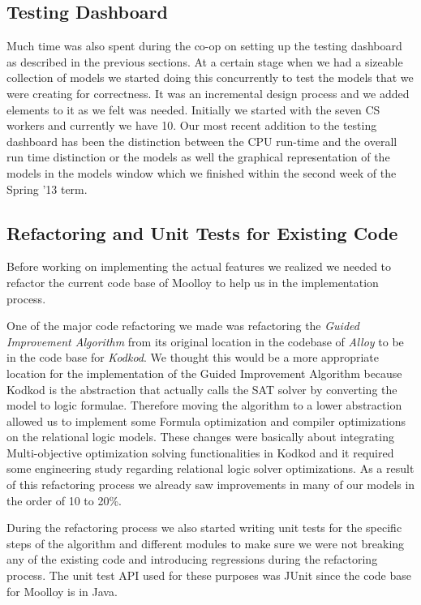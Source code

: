 \documentclass[11pt]{article}
\theoremstyle{definition}
\begin{document}
\subsection{Testing Dashboard}
Much time was also spent during the co-op on setting up the testing dashboard as described in the previous sections. At a certain stage when we had a sizeable collection of models we started doing this concurrently to test the models that we were creating for correctness. It was an incremental design process and we added elements to it as we felt was needed. Initially we started with the seven CS workers and currently we have 10. Our most recent addition to the testing dashboard has been the distinction between the CPU run-time and the overall run time distinction or the models as well the graphical representation of the models in the models window which we finished within the second week of the Spring '13 term.

\subsection{Refactoring and Unit Tests for Existing Code} \label{sec:refactor}
Before working on implementing the actual features we realized we needed to refactor the current code base of Moolloy to help us in the implementation process.

One of the major code refactoring we made was refactoring the \emph{Guided Improvement Algorithm} from its original location in the codebase of \emph{Alloy} to be in the code base for \emph{Kodkod}. We thought this would be a more appropriate location for the implementation of the Guided Improvement Algorithm because Kodkod is the abstraction that actually calls the SAT solver by converting the model to logic formulae. Therefore moving the algorithm to a lower abstraction allowed us to implement some Formula optimization and compiler optimizations on the relational logic models. These changes were basically about integrating Multi-objective optimization solving functionalities in Kodkod and it required some engineering study regarding relational logic solver optimizations. As a result of this refactoring process we already saw improvements in many of our models in the order of 10 to 20\%.

During the refactoring process we also started writing unit tests for the specific steps of the algorithm and different modules to make sure we were not breaking any of the existing code and introducing regressions during the refactoring process. The unit test API used for these purposes was JUnit \cite{ref:junit} since the code base for Moolloy is in Java.
\end{document}
